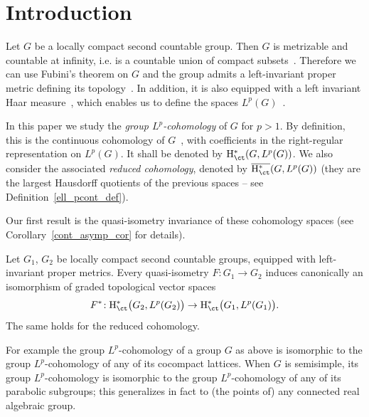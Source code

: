 \section{Introduction}\label{1}

Let $G$ be a locally compact second countable group. Then $G$ is metrizable and countable at infinity, i.e. is a countable union of compact subsets~\cite[Chapter~IX, \textsection~2.9, Corollary to Proposition~16, p.~21]{BBK-TG-5to10}. Therefore we can use Fubini's theorem on $G$ and the group admits a left-invariant proper metric defining its topology~\cite[Struble~Theorem~2.B.4]{CdH}. In addition, it is also equipped with a left invariant Haar measure~\cite[Chapter~VII, \textsection~1.2, Theorem~1]{BBK-INT-7}, which enables us to define the spaces $L^p(G)$~\cite[Chapter~IV, \textsection~3.4, Definition~2]{BBK-INT-1to4}.

In this paper we study the \emph{group $L^p$-cohomology} of $G$ for $p>1$. By definition, this is the continuous cohomology of $G$~\cite[Chapter~IX]{BW}, with coefficients in the right-regular representation on $L^p(G)$. It shall be denoted by ${\rm H}^*_{\ct} (G, L^p(G))$. We also consider the associated \emph{reduced cohomology}, denoted by $\overline{{\rm H}^*_{\ct}} (G, L^p(G))$ (they are the largest Hausdorff quotients of the previous spaces -- see Definition~\ref{ell_pcont_def}).

Our first result is the quasi-isometry invariance of these cohomology spaces (see Corollary~\ref{cont_asymp_cor} for details).


\begin{theo}\label{intro-thm1}
Let $G_1$, $G_2$ be locally compact second countable groups, equip\-ped with left-invariant proper metrics. Every quasi-isometry $F: G_1 \to G_2$ induces canonically an isomorphism of graded topological vector spaces
\[
F ^*\!: {\rm H}^*_{\ct} \bigl(G_2, L^p(G_2) \bigr) \to {\rm H}^*_{\ct} \bigl(G_1, L^p(G_1) \bigr).
\]
The same holds for the reduced cohomology.
\end{theo}

For example the group $L^p$-cohomology of a group $G$ as above is isomorphic to the group $L^p$-cohomology of any of its cocompact lattices. When $G$ is semisimple, its group $L^p$-cohomology is isomorphic to the group $L^p$-cohomology of any of its parabolic subgroups; this generalizes in fact to (the points of) any connected real algebraic group.

